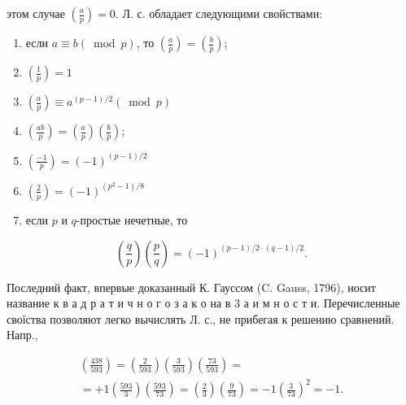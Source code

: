 \documentclass[10pt]{article}
\begin{document}
этом случае $\left(\frac{a}{p}\right)=0$. Л. с. обладает следующими свойствами:



\begin{enumerate}

  \item если $a \equiv b(\bmod p)$, то $\left(\frac{a}{p}\right)=\left(\frac{b}{p}\right)$;



  \item $\left(\frac{1}{p}\right)=1$



  \item $\left(\frac{a}{p}\right) \equiv a^{(p-1) / 2}(\bmod p)$



  \item $\left(\frac{a b}{p}\right)=\left(\frac{a}{p}\right)\left(\frac{b}{p}\right)$;



  \item $\left(\frac{-1}{p}\right)=(-1)^{(p-1) / 2}$



  \item $\left(\frac{2}{p}\right)=(-1)^{\left(p^{2}-1\right) / 8}$



  \item если $p$ и $q$-простые нечетные, то



\end{enumerate}



\[

\left(\frac{q}{p}\right)\left(\frac{p}{q}\right)=(-1)^{(p-1) / 2 \cdot(q-1) / 2} .

\]



Последний факт, впервые доказанный К. Гауссом (C. Gauss, 1796), носит название к в а д р а т и ч н о г о з а к о на в 3 а и м н о с т и. Перечисленные своїства позволяют легко вычислять Л. с., не прибегая к решению сравнений. Напр.,



\[

\begin{gathered}

\left(\frac{438}{593}\right)=\left(\frac{2}{593}\right)\left(\frac{3}{593}\right)\left(\frac{73}{593}\right)= \\

=+1\left(\frac{593}{3}\right)\left(\frac{593}{73}\right)=\left(\frac{2}{3}\right)\left(\frac{9}{73}\right)=-1\left(\frac{3}{73}\right)^{2}=-1 .

\end{gathered}

\]
\end{document}
